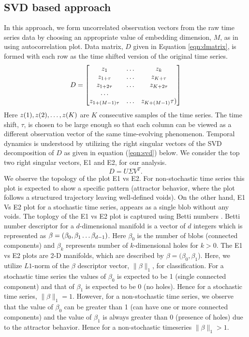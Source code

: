\documentclass[journal]{IEEEtran}
\begin{document}
	\subsection{SVD based approach}
	In this approach, we form uncorrelated observation vectors from the raw time series data  by choosing an appropriate value of embedding dimension, $M$, as in \cite{misra2006} using autocorrelation plot. Data matrix, $D$ given in Equation \ref{eqn:dmatrix}, is formed with each row  as the  time shifted version of the original time series.
	\begin{equation} \label{eqn:dmatrix}
		D= \begin{bmatrix} z_1  & \mathellipsis & z_k \\
			   z_{1 + \tau} &  \mathellipsis & z_{K + \tau}\\
		       z_{1 + 2\tau} &  \mathellipsis &z_{K + 2\tau} \\
			   \mathellipsis \\
			   z_{1 + (M-1)\tau} & \mathellipsis & z_{K + (M-1)}\tau)\\
		\end{bmatrix}
		\end{equation}
	Here $z(1), z(2), \mathellipsis, z(K)$ are $K$ consecutive samples of the time series. The time shift, $\tau$, is chosen to be large enough so that each column can be viewed as a different observation vector of the same time-evolving phenomenon. Temporal dynamics is understood by utilizing the right singular vectors of the SVD decomposition of $D$ as given in equation (\ref{eqn:svd}) below. We consider the top two right singular vectors, E1 and E2, for our analysis.
	\begin{equation}
		D = U \Sigma V^T.
		\label{eqn:svd}
	\end{equation}
	We observe the topology of the plot E1 vs E2. For non-stochastic time series this plot is expected to show a specific pattern (attractor behavior, where the plot follows a structured trajectory leaving  well-defined voids). On the other hand, E1 Vs E2 plot for a stochastic time series, appears as a single blob without any voids. The toplogy of the E1 vs E2 plot is  captured using Betti numbers \cite{jmlr}. Betti number descriptor for a $d$-dimensional manifold is a vector of $d$ integers which is represented as $\beta = (\beta_0, \beta_1 \mathellipsis \beta_{d-1})$. Here $\beta_{0}$ is the number of blobs (connected components) and $\beta_k$ represents number of $k$-dimensional holes for $k>0$.  The E1 vs E2 plots are 2-D manifolds, which are described by  $\beta=(\beta_{0}, \beta_{1}$). Here, we utilize $L1$-norm of the $\beta$ descriptor vector, $\|\beta\|_1$, for classification.  For a stochastic time series the values of $\beta_{0}$  is expected to be 1 (single connected component) and that of $\beta_1$ is expected to be 0 (no holes). Hence for a stochastic time series, $\|\beta\|_1 = 1$. However, for a non-stochastic time series, we observe that the value of $\beta_{0}$ can be greater than 1 (can have one or more connected components) and the value of $\beta_1$ is always greater than 0 (presence of holes) due to the attractor behavior. Hence for a non-stochastic timeseries $\|\beta\|_1 > 1$.
	
\end{document}
